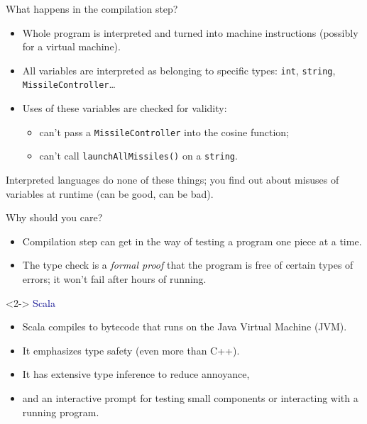 \documentclass{beamer}
\begin{document}
\begin{frame}{What happens in the compilation step?}
\begin{itemize}
\item Whole program is interpreted and turned into machine instructions (possibly for a virtual machine).
\item All variables are interpreted as belonging to specific types: {\tt \small int}, {\tt \small string}, {\tt \small MissileController}\ldots
\item Uses of these variables are checked for validity:
\begin{itemize}
\item can't pass a {\tt \small MissileController} into the cosine function;
\item can't call {\tt \small launchAllMissiles()} on a {\tt \small string}.
\end{itemize}
\end{itemize}

\vfill
Interpreted languages do none of these things; you find out about misuses of variables at runtime (can be good, can be bad).
\end{frame}

\begin{frame}{Why should you care?}
\begin{itemize}
\item Compilation step can get in the way of testing a program one piece at a time.
\item The type check is a {\it formal proof} that the program is free of certain types of errors; it won't fail after hours of running.
\end{itemize}

\vfill
\begin{uncoverenv}<2->
\hspace{-0.83 cm} \textcolor{darkblue}{\Large Scala}

\begin{itemize}
\item Scala compiles to bytecode that runs on the Java Virtual Machine (JVM).
\item It emphasizes type safety (even more than C++).
\item It has extensive type inference to reduce annoyance,
\item and an interactive prompt for testing small components or interacting with a running program.
\end{itemize}
\end{uncoverenv}
\end{frame}
\end{document}
